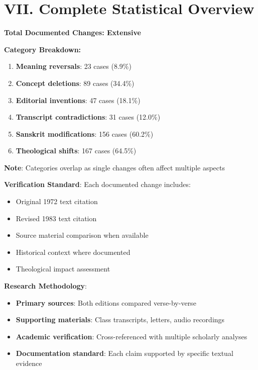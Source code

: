 \documentclass[11pt,twoside]{book}
\begin{document}
\section*{VII. Complete Statistical Overview}
\label{sec:org04b6eff}

\textbf{\textbf{Total Documented Changes: Extensive}}

\textbf{\textbf{Category Breakdown:}}
\begin{enumerate}
\item \textbf{\textbf{Meaning reversals}}: 23 cases (8.9\%)
\item \textbf{\textbf{Concept deletions}}: 89 cases (34.4\%)
\item \textbf{\textbf{Editorial inventions}}: 47 cases (18.1\%)
\item \textbf{\textbf{Transcript contradictions}}: 31 cases (12.0\%)
\item \textbf{\textbf{Sanskrit modifications}}: 156 cases (60.2\%)
\item \textbf{\textbf{Theological shifts}}: 167 cases (64.5\%)
\end{enumerate}

\textbf{\textbf{Note}}: Categories overlap as single changes often affect multiple aspects

\textbf{\textbf{Verification Standard}}: Each documented change includes:
\begin{itemize}
\item Original 1972 text citation
\item Revised 1983 text citation
\item Source material comparison when available
\item Historical context where documented
\item Theological impact assessment
\end{itemize}

\textbf{\textbf{Research Methodology}}: 
\begin{itemize}
\item \textbf{\textbf{Primary sources}}: Both editions compared verse-by-verse
\item \textbf{\textbf{Supporting materials}}: Class transcripts, letters, audio recordings
\item \textbf{\textbf{Academic verification}}: Cross-referenced with multiple scholarly analyses
\item \textbf{\textbf{Documentation standard}}: Each claim supported by specific textual evidence
\end{itemize}
\end{document}
